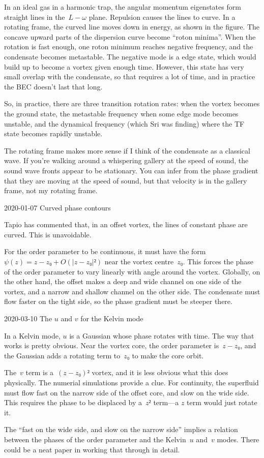 In an ideal gas in a harmonic trap, the angular momentum eigenstates form straight lines in the~$L-ω$ plane.  Repulsion causes the lines to curve.  In a rotating frame, the curved line moves down in energy, as shown in the figure.  The concave upward parts of the dispersion curve become “roton minima”.  When the rotation is fast enough, one roton minimum reaches negative frequency, and the condensate becomes metastable.  The negative mode is a edge state, which would build up to become a vortex given enough time.  However, this state has very small overlap with the condensate, so that requires a lot of time, and in practice the BEC doesn't last that long.

So, in practice, there are three transition rotation rates: when the vortex becomes the ground state, the metastable frequency when some edge mode becomes unstable, and the dynamical frequency (which Sri was finding) where the TF state becomes rapidly unstable.

The rotating frame makes more sense if I think of the condensate as a classical wave.  If you're walking around a whispering gallery at the speed of sound, the sound wave fronts appear to be stationary.  You can infer from the phase gradient that they are moving at the speed of sound, but that velocity is in the gallery frame, not my rotating frame.

2020-01-07 Curved phase contours

Tapio has commented that, in an offset vortex, the lines of constant
phase are curved.  This is unavoidable.

For the order parameter to be continuous, it must have the
form~$ψ(z)=z-z₀+O(|z-z₀|²)$ near the vortex centre~$z₀$.  This
forces the phase of the order parameter to vary linearly with angle
around the vortex.  Globally, on the other hand, the offset makes
a deep and wide channel on one side of the vortex, and a narrow and
shallow channel on the other side.  The condensate must flow faster
on the tight side, so the phase gradient must be steeper there.

2020-03-10 The $u$ and $v$ for the Kelvin mode

In a Kelvin mode, $u$ is a Gaussian whose phase rotates with time.
The way that works is pretty obvious.  Near the vortex core, the
order parameter is~$z-z₀$, and the Gaussian adds a rotating term
to~$z₀$ to make the core orbit.

The~$v$ term is a~$(z-z₀)²$ vortex, and it is less obvious what
this does physically.  The numerial simulations provide a clue.
For continuity, the superfluid must flow fast on the narrow side
of the offset core, and slow on the wide side.  This requires the
phase to be displaced by a~$z²$ term—a $z$ term would just rotate
it.

The “fast on the wide side, and slow on the narrow side” implies a
relation between the phases of the order parameter and the Kelvin~$u$
and~$v$ modes.  There could be a neat paper in working that through
in detail.

\bye